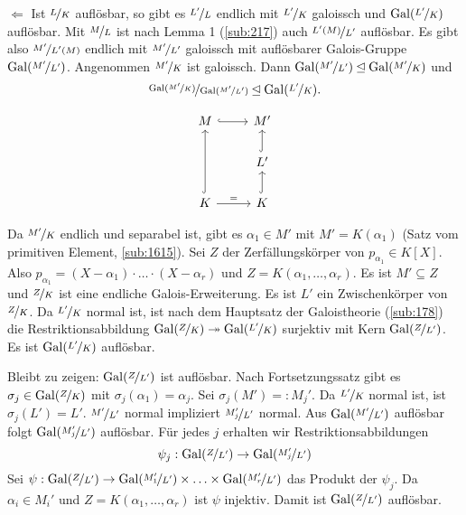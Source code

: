 \begin{enumerate}[a)]
	\begin{minipage}{0.75\textwidth}
		\glqq$\Longleftarrow$\grqq{} Ist $\nicefrac{L}{K}$ auflösbar, so gibt es $\nicefrac{L'}{L}$ endlich mit $\nicefrac{L'}{K}$ galoissch und $\operatorname{Gal}(\nicefrac{L'}{K})$
		auflösbar. Mit $\nicefrac{M}{L}$ ist nach Lemma 1 (\ref{sub:217}) auch $\nicefrac{L'(M)}{L'}$ auflösbar. Es gibt also $\nicefrac{M'}{L'(M)}$ endlich mit 
		$\nicefrac{M'}{L'}$ galoissch mit auflösbarer Galois-Gruppe $\operatorname{Gal}(\nicefrac{M'}{L'})$.
		Angenommen $\nicefrac{M'}{K}$ ist galoissch. Dann $\operatorname{Gal}(\nicefrac{M'}{L'}) \unlhd \operatorname{Gal}(\nicefrac{M'}{K})$ und
		\[
			\nicefrac{\operatorname{Gal}(\nicefrac{M'}{K})}{\operatorname{Gal}(\nicefrac{M'}{L'})} \unlhd  \operatorname{Gal}( \nicefrac{L'}{K}).
		\]
	\end{minipage}\quad 
	\begin{minipage}{0.17\textwidth}
		\[
			\begin{tikzcd}
						M \rar[hook]&  M'\\
						  & L' \uar[hook] \\
						K \arrow[hook]{uu} \rar{=} & K \uar[hook]
			\end{tikzcd}
		\]
	\end{minipage}
	
	
	Da $\nicefrac{M'}{K}$ endlich und separabel ist, gibt es $\alpha_1 \in M'$ mit $M'=K(\alpha_1)$ (Satz vom primitiven Element, \ref{sub:1615}). Sei $Z$ der 
	Zerfällungskörper von $p_{\alpha_1} \in K[X]$. Also $p_{\alpha_1} = (X-\alpha_1) \cdot \ldots \cdot (X-\alpha_r)$ und $Z=K(\alpha_1, \ldots , \alpha_r)$.
	Es ist $M' \subseteq Z$ und $\nicefrac{Z}{K}$ ist eine endliche Galois-Erweiterung. Es ist $L'$ ein Zwischenkörper von $\nicefrac{Z}{K}$. Da $\nicefrac{L'}{K}$ normal
	ist, ist nach dem Hauptsatz der Galoistheorie (\ref{sub:178}) die Restriktionsabbildung $\operatorname{Gal}(\nicefrac{Z}{K}) \twoheadrightarrow \operatorname{Gal}(\nicefrac{L'}{K})$ surjektiv mit 
	Kern $\operatorname{Gal}(\nicefrac{Z}{L'})$. Es ist $\operatorname{Gal}(\nicefrac{L'}{K})$ auflösbar.
	
	Bleibt zu zeigen: $\operatorname{Gal}(\nicefrac{Z}{L'})$ ist auflösbar. Nach Fortsetzungssatz gibt es $\sigma_j \in \operatorname{Gal}(\nicefrac{Z}{K})$ mit $\sigma_j(\alpha_1) = \alpha_j$.
	Sei $\sigma_j(M') =: M_j'$. Da $\nicefrac{L'}{K}$ normal ist, ist $\sigma_j(L') = L'$. $\nicefrac{M'}{L'}$ normal impliziert $\nicefrac{M_j'}{L'}$ normal.
	Aus $\operatorname{Gal}(\nicefrac{M'}{L'})$ auflösbar folgt $\operatorname{Gal}(\nicefrac{M_j'}{L'})$ auflösbar. Für jedes $j$ erhalten wir Restriktionsabbildungen
	\[
		\psi_j : \operatorname{Gal} (\nicefrac{Z}{L'}) \to \operatorname{Gal}(\nicefrac{M_j'}{L'})
	\]
	Sei $\psi : \operatorname{Gal}(\nicefrac{Z}{L'}) \to \operatorname{Gal}(\nicefrac{M_1'}{L'}) \times \ldots \times \operatorname{Gal}(\nicefrac{M_r'}{L'})$ das Produkt der $\psi_j$. Da $\alpha_i \in M_i'$ und
	$Z=K(\alpha_1, \ldots , \alpha_r)$ ist $\psi$ injektiv. Damit ist $\operatorname{Gal}(\nicefrac{Z}{L'})$ auflösbar. \bewende
\end{enumerate}

